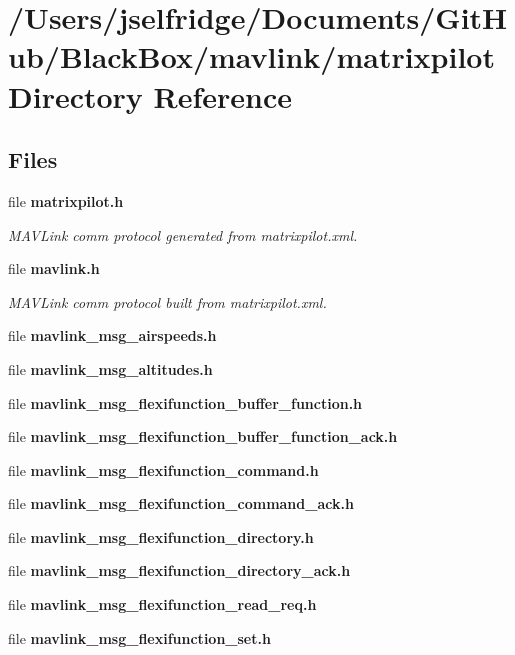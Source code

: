 \section{/\+Users/jselfridge/\+Documents/\+Git\+Hub/\+Black\+Box/mavlink/matrixpilot Directory Reference}
\label{dir_e69739b4521a7c13597feba6ed30af51}
\subsection*{Files}
\begin{DoxyCompactItemize}
\item 
file \textbf{ matrixpilot.\+h}
\begin{DoxyCompactList}\small\item\em M\+A\+V\+Link comm protocol generated from matrixpilot.\+xml. \end{DoxyCompactList}\item 
file \textbf{ mavlink.\+h}
\begin{DoxyCompactList}\small\item\em M\+A\+V\+Link comm protocol built from matrixpilot.\+xml. \end{DoxyCompactList}\item 
file \textbf{ mavlink\+\_\+msg\+\_\+airspeeds.\+h}
\item 
file \textbf{ mavlink\+\_\+msg\+\_\+altitudes.\+h}
\item 
file \textbf{ mavlink\+\_\+msg\+\_\+flexifunction\+\_\+buffer\+\_\+function.\+h}
\item 
file \textbf{ mavlink\+\_\+msg\+\_\+flexifunction\+\_\+buffer\+\_\+function\+\_\+ack.\+h}
\item 
file \textbf{ mavlink\+\_\+msg\+\_\+flexifunction\+\_\+command.\+h}
\item 
file \textbf{ mavlink\+\_\+msg\+\_\+flexifunction\+\_\+command\+\_\+ack.\+h}
\item 
file \textbf{ mavlink\+\_\+msg\+\_\+flexifunction\+\_\+directory.\+h}
\item 
file \textbf{ mavlink\+\_\+msg\+\_\+flexifunction\+\_\+directory\+\_\+ack.\+h}
\item 
file \textbf{ mavlink\+\_\+msg\+\_\+flexifunction\+\_\+read\+\_\+req.\+h}
\item 
file \textbf{ mavlink\+\_\+msg\+\_\+flexifunction\+\_\+set.\+h}
\item 

\end{DoxyCompactItemize}

